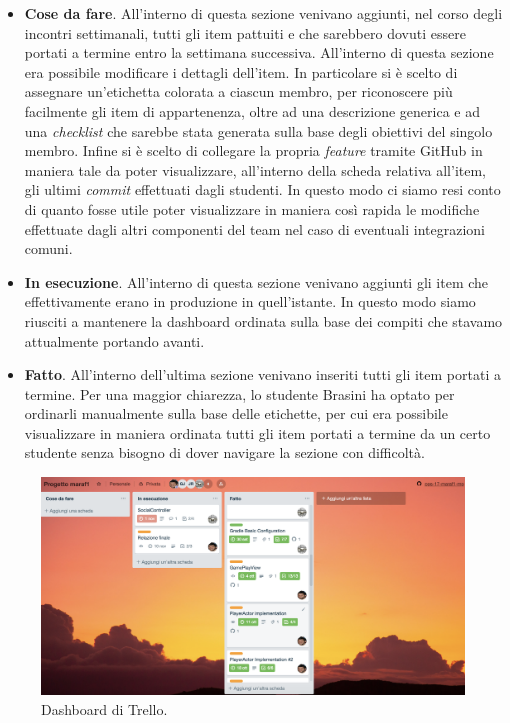      \begin{itemize}
     \item \textbf{Cose da fare}. All'interno di questa sezione venivano aggiunti, nel corso degli incontri settimanali, tutti gli item pattuiti e che sarebbero dovuti essere portati a termine entro la settimana successiva. All'interno di questa sezione era possibile modificare i dettagli dell'item. In particolare si è scelto di assegnare un'etichetta colorata a ciascun membro, per riconoscere più facilmente gli item di appartenenza, oltre ad una descrizione generica e ad una \textit{checklist} che sarebbe stata generata sulla base degli obiettivi del singolo membro. Infine si è scelto di collegare la propria \textit{feature} tramite GitHub in maniera tale da poter visualizzare, all'interno della scheda relativa all'item, gli ultimi \textit{commit} effettuati dagli studenti. In questo modo ci siamo resi conto di quanto fosse utile poter visualizzare in maniera così rapida le modifiche effettuate dagli altri componenti del team nel caso di eventuali integrazioni comuni. 
    \item \textbf{In esecuzione}. All'interno di questa sezione venivano aggiunti gli item che effettivamente erano in produzione in quell'istante. In questo modo siamo riusciti a mantenere la dashboard ordinata sulla base dei compiti che stavamo attualmente portando avanti.
    \item \textbf{Fatto}. All'interno dell'ultima sezione venivano inseriti tutti gli item portati a termine. Per una maggior chiarezza, lo studente Brasini ha optato per ordinarli manualmente sulla base delle etichette, per cui era possibile visualizzare in maniera ordinata tutti gli item portati a termine da un certo studente senza bisogno di dover navigare la sezione con difficoltà.
    	\end{itemize}    
     
     	  \begin{figure}[!tbh]
 	 \includegraphics[width=\linewidth]{trello_dashboard.png}
 	 \caption{Dashboard di Trello.}
  	\label{fig:trello_dashboard}
	\end{figure}
  
